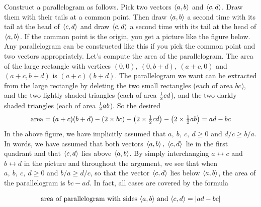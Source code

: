 Construct a parallelogram as follows. Pick two vectors $\left< a,b\right> $ 
and $\left< c,d\right> $. Draw them with their tails at a common point. Then 
draw $\left< a,b\right> $ a second time with its tail at the head of 
$\left< c,d\right> $ and draw  $\left< c,d\right> $ a second time with its tail 
at the head of $\left< a,b\right> $. If the common point is the
origin, you get a picture like the figure below.
%
Any parallelogram can be constructed like this if you pick the common point
and two vectors appropriately. Let's compute the area of the parallelogram.
The area of the large rectangle with vertices $(0,0),\ (0, b+d),\ (a+c,0)$
and $(a+c,b+d)$ is $(a+c)(b+d)$. The parallelogram we want can be extracted
from the large rectangle by deleting the two small rectangles (each of
area $bc$), and the two lightly shaded triangles (each of area $\tfrac{1}{2} cd$),
and the two darkly shaded triangles (each of area $\tfrac{1}{2} ab$). So the desired
\begin{align*}
{\rm area} = (a+c)(b+d) - (2\times bc) -\big(2\times \tfrac{1}{2} cd\big)
 -\big(2\times\tfrac{1}{2} ab\big)
=ad-bc
\end{align*}
In the above figure, we have implicitly assumed that $a,\ b,\ c,\ d\ge 0$
and $d/c\ge b/a$. In words, we have assumed that both vectors 
$\left< a,b\right> ,\ \left< c,d\right> $ lie in the first quadrant and that 
$\left< c,d\right> $ lies above $\left< a,b\right> $.
By simply interchanging $a\leftrightarrow c$ and $b\leftrightarrow d$
in the picture and throughout the argument, we see that when 
$a,\ b,\ c,\ d\ge 0$ and $b/a\ge d/c$, so that the vector $\left< c,d\right> $ 
lies below $\left< a,b\right> $, the area of the parallelogram is $bc-ad$. 
In fact, all cases are covered by the formula
\begin{impeqn}\label{eq pgram area}
\begin{align*}
\text{area of parallelogram with sides $\left< a,b\right> $ and $\left< c,d\right> =|ad-bc|$}
\end{align*}
\end{impeqn}

